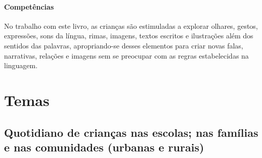 \documentclass[11pt]{extarticle}
\begin{document}

\paragraph{Competências} No trabalho com este livro, as crianças são 
estimuladas a explorar olhares, gestos, expressões, sons da língua, 
rimas, imagens, textos escritos e ilustrações além dos sentidos das palavras, 
apropriando-se desses elementos para criar novas falas, narrativas, relações 
e imagens sem se preocupar com as regras estabelecidas na linguagem.



\section{Temas}


\subsection{Quotidiano de crianças nas escolas; nas famílias e nas comunidades (urbanas e rurais)}
\end{document}
